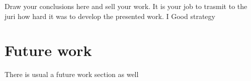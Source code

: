 \documentclass[defaultstyle,10pt,master,Helvetica]{thesis}
\begin{document}
Draw your conclusions here and sell your work. It is your job to trasmit to the juri how hard it was to develop the presented work. I Good strategy 


\section{Future work}
There is usual a future work section as well

\cleardoublepage

% 

% 

\cleardoublepage

\appendix
\cleardoublepage

\cleardoublepage
\end{document}
